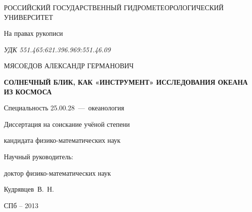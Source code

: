 \thispagestyle{empty}

\begin{center}
РОССИЙСКИЙ ГОСУДАРСТВЕННЫЙ ГИДРОМЕТЕОРОЛОГИЧЕСКИЙ УНИВЕРСИТЕТ\par
\par 
\par
\end{center}

\vspace{20mm}
\begin{flushright}
На правах рукописи

{\sl УДК 551.465:621.396.969:551.46.09}

\end{flushright}

\vspace{30mm}
\begin{center}
{\large МЯСОЕДОВ АЛЕКСАНДР ГЕРМАНОВИЧ}
\end{center}

\vspace{5mm}
\begin{center}
{\bf \large СОЛНЕЧНЫЙ БЛИК, КАК «ИНСТРУМЕНТ» ИССЛЕДОВАНИЯ ОКЕАНА ИЗ КОСМОСА
\par}

\vspace{10mm}
{%
Специальность 25.00.28~---~океанология
}

\vspace{10mm}
Диссертация на соискание учёной степени

кандидата физико-математических наук
\end{center}

\vspace{20mm}
\begin{flushright}
Научный руководитель:

доктор физико-математических наук

Кудрявцев~В.~Н.

\end{flushright}

\vspace{20mm}
\begin{center}
{СПб -- 2013}
\end{center}

\newpage